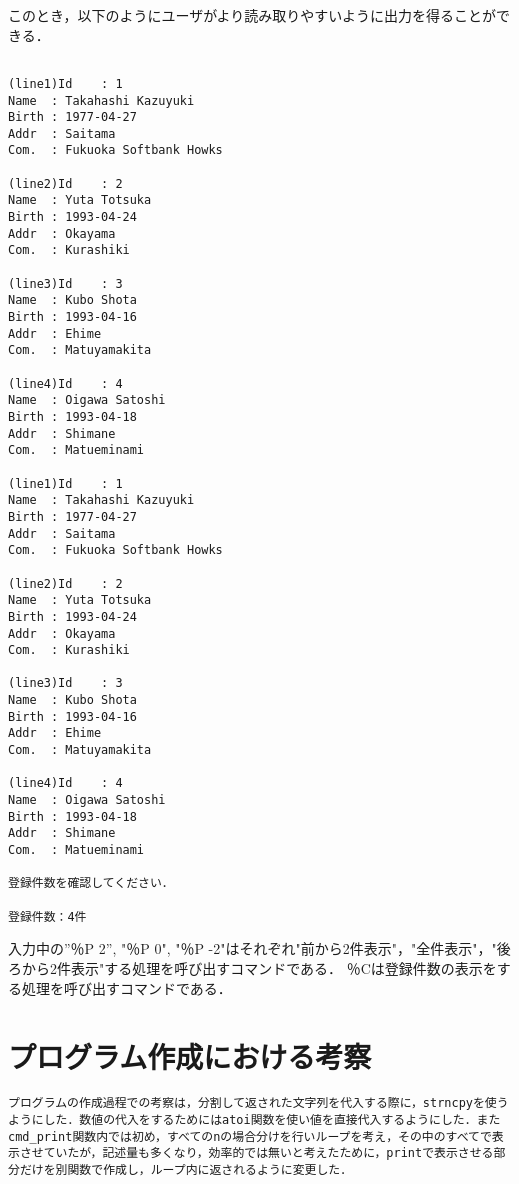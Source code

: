 \documentclass[a4j]{jarticle}
\begin{document}
このとき，以下のようにユーザがより読み取りやすいように出力を得ることができる．

{\baselineskip 3mm
\begin{verbatim}

(line1)Id    : 1
Name  : Takahashi Kazuyuki
Birth : 1977-04-27
Addr  : Saitama
Com.  : Fukuoka Softbank Howks

(line2)Id    : 2
Name  : Yuta Totsuka
Birth : 1993-04-24
Addr  : Okayama
Com.  : Kurashiki

(line3)Id    : 3
Name  : Kubo Shota
Birth : 1993-04-16
Addr  : Ehime
Com.  : Matuyamakita

(line4)Id    : 4
Name  : Oigawa Satoshi
Birth : 1993-04-18
Addr  : Shimane
Com.  : Matueminami

(line1)Id    : 1
Name  : Takahashi Kazuyuki
Birth : 1977-04-27
Addr  : Saitama
Com.  : Fukuoka Softbank Howks

(line2)Id    : 2
Name  : Yuta Totsuka
Birth : 1993-04-24
Addr  : Okayama
Com.  : Kurashiki

(line3)Id    : 3
Name  : Kubo Shota
Birth : 1993-04-16
Addr  : Ehime
Com.  : Matuyamakita

(line4)Id    : 4
Name  : Oigawa Satoshi
Birth : 1993-04-18
Addr  : Shimane
Com.  : Matueminami

登録件数を確認してください．

登録件数：4件

\end{verbatim}
}

入力中の”％P 2”, "％P 0", "％P -2"はそれぞれ"前から2件表示"，"全件表示"，"後ろから2件表示"する処理を呼び出すコマンドである．
％Cは登録件数の表示をする処理を呼び出すコマンドである．

%
%

\section{プログラム作成における考察}

\begin{verbatim}
プログラムの作成過程での考察は，分割して返された文字列を代入する際に，strncpyを使うようにした．数値の代入をするためにはatoi関数を使い値を直接代入するようにした．またcmd_print関数内では初め，すべてのnの場合分けを行いループを考え，その中のすべてで表示させていたが，記述量も多くなり，効率的では無いと考えたために，printで表示させる部分だけを別関数で作成し，ループ内に返されるように変更した．

\end{verbatim}
\end{document}
